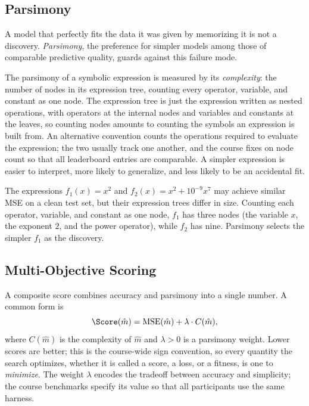 \subsection{Parsimony}

A model that perfectly fits the data it was given by memorizing it is not a discovery.
\emph{Parsimony}, the preference for simpler models among those of comparable predictive quality, guards against this failure mode.

The parsimony of a symbolic expression is measured by its \emph{complexity}: the number of nodes in its expression tree, counting every operator, variable, and constant as one node.
The expression tree is just the expression written as nested operations, with operators at the internal nodes and variables and constants at the leaves, so counting nodes amounts to counting the symbols an expression is built from.
An alternative convention counts the operations required to evaluate the expression; the two usually track one another, and the course fixes on node count so that all leaderboard entries are comparable.
A simpler expression is easier to interpret, more likely to generalize, and less likely to be an accidental fit.

\begin{example}
The expressions $f_1(x) = x^2$ and $f_2(x) = x^2 + 10^{-9} x^7$ may achieve similar MSE on a clean test set, but their expression trees differ in size.
Counting each operator, variable, and constant as one node, $f_1$ has three nodes (the variable $x$, the exponent $2$, and the power operator), while $f_2$ has nine.
Parsimony selects the simpler $f_1$ as the discovery.
\end{example}

\subsection{Multi-Objective Scoring}
\label{subsection:MultiObjectiveScoring}

A composite score combines accuracy and parsimony into a single number.
A common form is
\begin{equation}
\Score(\hat{m}) = \mathrm{MSE}(\hat{m}) + \lambda \cdot C(\hat{m}) ,
\label{equation:CompositeScore}
\end{equation}
where $C(\hat{m})$ is the complexity of $\hat{m}$ and $\lambda > 0$ is a parsimony weight.
Lower scores are better; this is the course-wide sign convention, so every quantity the search optimizes, whether it is called a score, a loss, or a fitness, is one to \emph{minimize}.
The weight $\lambda$ encodes the tradeoff between accuracy and simplicity; the course benchmarks specify its value so that all participants use the same harness.


